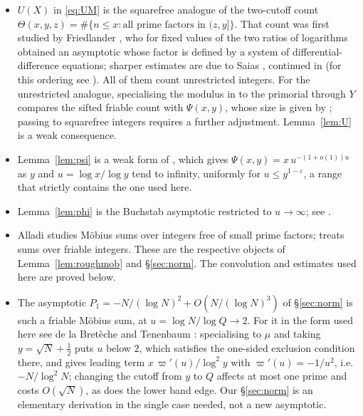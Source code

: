\documentclass[11pt,a4paper]{article}
\theoremstyle{plain}
\theoremstyle{definition}
\theoremstyle{remark}
\newcommand{\eps}{\varepsilon}
\begin{document}
\begin{itemize}
\item $U(X)$ in \eqref{eq:UM} is the squarefree analogue of the two-cutoff count
$\Theta(x,y,z)=\#\{n\le x:\text{all prime factors in }(z,y]\}$. That count was first studied by
Friedlander \cite{Friedlander}, who for fixed values of the two ratios of logarithms obtained an
asymptotic whose factor is defined by a system of differential-difference equations; sharper estimates are due
to Saias \cite{SaiasI}, continued in \cite{SaiasII} (for this ordering see
\cite[\S7]{HildebrandTenenbaum}). All of them count unrestricted integers. For the unrestricted analogue, specialising the modulus
in \cite[(1.4)]{TenenbaumCribler} to the primorial through $Y$ compares the sifted friable count with
$\Psi(x,y)$, whose size is given by \cite[Thm.~1.1]{HildebrandTenenbaum}; passing to squarefree integers
requires a further adjustment. Lemma~\ref{lem:U} is a weak consequence.
\item Lemma~\ref{lem:psi} is a weak form of \cite[Cor.~1.3]{HildebrandTenenbaum}, which gives
$\Psi(x,y)=x\,u^{-(1+o(1))u}$ as $y$ and $u=\log x/\log y$ tend to infinity, uniformly for
$u\le y^{1-\eps}$, a range that strictly contains the one used here.
\item Lemma~\ref{lem:phi} is the Buchstab asymptotic restricted to $u\to\infty$; see
\cite[ch.~III.6]{TenenbaumBook}.
\item Alladi \cite{AlladiJNT} studies M\"obius sums over integers free of small prime factors;
\cite{AlladiTAMS} treats sums over friable integers. These are the respective objects of
Lemma~\ref{lem:roughmob} and \S\ref{sec:norm}. The convolution and estimates used here are proved below.

\item The asymptotic $P_{1}=-N/(\log N)^{2}+O(N/(\log N)^{3})$ of \S\ref{sec:norm} is such a friable
M\"obius sum, at $u=\log N/\log Q\to2$. For it in the form used here see de la Bret\`eche and Tenenbaum
\cite[Cor.~1.3, (1.23)]{BTWirsing}: specialising to $\mu$ and taking $y=\sqrt N+\tfrac12$ puts $u$ below
$2$, which satisfies the one-sided exclusion condition there, and gives leading term
$x\,\varpi'(u)/\log^{2}y$ with $\varpi'(u)=-1/u^{2}$, i.e.\ $-N/\log^{2}N$; changing the cutoff from $y$
to $Q$ affects at most one prime and costs $O(\sqrt N)$, as does the lower band edge. Our
\S\ref{sec:norm} is an elementary derivation in the single case needed, not a new asymptotic.
\end{itemize}
\end{document}
